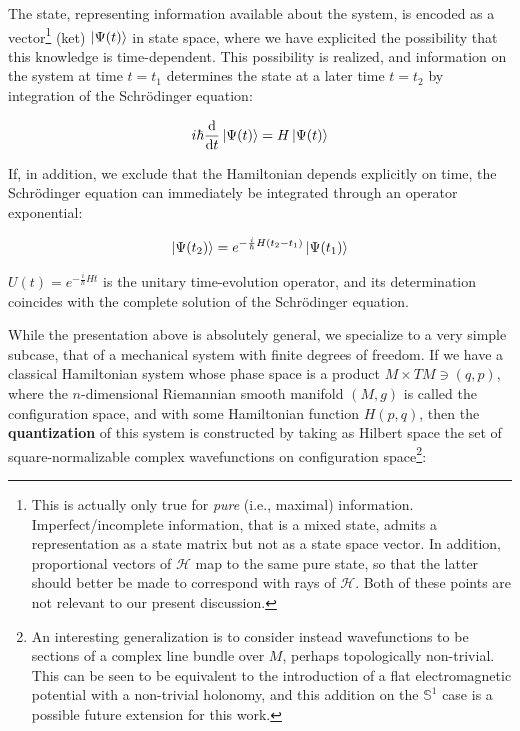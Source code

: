 \documentclass{article}
\newcommand{\hil}{\ensuremath{\mathcal{H}}}
\begin{document}
The state, representing information available about the system, is encoded as a vector\footnote{This is actually only true for \emph{pure} (i.e., maximal) information. Imperfect/incomplete information, that is a mixed state, admits a representation as a state matrix but not as a state space vector. In addition, proportional vectors of $\hil$ map to the same pure state, so that the latter should better be made to correspond with rays of $\hil$. Both of these points are not relevant to our present discussion.} (ket) $\ket{\Psi(t)}$ in state space, where we have explicited the possibility that this knowledge is time-dependent. This possibility is realized, and information on the system at time $t=t_1$ determines the state at a later time $t=t_2$ by integration of the Schr\"odinger equation:

\begin{equation}
    i \hbar \dv{t}\ket{\Psi(t)} = H \ket{\Psi(t)}
\end{equation}


If, in addition, we exclude that the Hamiltonian depends explicitly on time, the Schr\"odinger equation can immediately be integrated through an operator exponential:

\begin{equation}
    \ket{\Psi(t_2)} = e^{-\frac{i}{\hbar} H (t_2-t_1)} \ket{\Psi(t_1)} 
\end{equation}

$U(t) = e^{-\frac{i}{\hbar} H t}$ is the unitary time-evolution operator, and its determination coincides with the complete solution of the Schr\"odinger equation.

While the presentation above is absolutely general, we specialize to a very simple subcase, that of a mechanical system with finite degrees of freedom. If we have a classical Hamiltonian system whose phase space is a product $M \times TM \ni (q,p)$, where the $n$-dimensional Riemannian smooth manifold $(M,g)$ is called the configuration space, and with some Hamiltonian function $H(p,q)$, then the \textbf{quantization} of this system is constructed by taking as Hilbert space the set of square-normalizable complex wavefunctions on configuration space\footnote{An interesting generalization is to consider instead wavefunctions to be sections of a complex line bundle over $M$, perhaps topologically non-trivial. This can be seen to be equivalent to the introduction of a flat electromagnetic potential with a non-trivial holonomy, and this addition on the $\mathbb{S}^1$ case is a possible future extension for this work.}:
\end{document}
